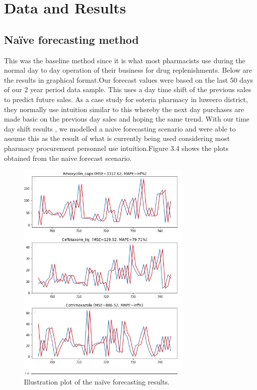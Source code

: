 \documentclass[12pt]{report}
\begin{document}
\section{Data and Results}

\subsection{Naïve forecasting method}
This was the baseline method since it is what most pharmacists use during the normal day to day operation of their business for drug replenishments. Below are the results in graphical format.Our forecast values were based on the last 50 days of our 2 year period data sample.
This uses a day time shift of the previous sales to predict future sales. As a case study for soteria pharmacy in luweero district, they normally use intuition similar to this whereby the next day purchases are made basic on the previous day sales and hoping the same trend.
With our time day shift results , we modelled a naive forecasting scenario and were able to assume this as the result of what is currently being used considering most pharmacy procurement personnel use intuition.Figure 3.4 shows the plots obtained from the naive forecast scenario.

\begin{figure}[H]%
  \begin {center}
  \includegraphics[width=0.75\textwidth]{images/download (13).png}
  \caption{Illustration plot of the naïve forecasting results.}
  \label{fig:ecg}
  \end {center}
\end{figure}
\end{document}
